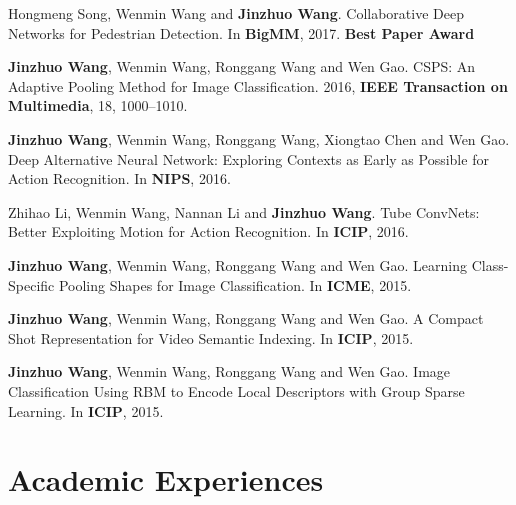 \documentclass[letterpaper]{article}
\renewenvironment{itemize}{
  \begin{list}{}{
    \setlength{\leftmargin}{1.5em}
  }
}{
  \end{list}
}
\begin{document}
\begin{itemize}
\item[9.] Hongmeng Song, Wenmin Wang and \textbf{Jinzhuo Wang}. Collaborative Deep Networks for Pedestrian Detection. In \textbf{BigMM}, 2017. \textbf{Best Paper Award}

\item[10.] \textbf{Jinzhuo Wang}, Wenmin Wang, Ronggang Wang and Wen Gao. CSPS: An Adaptive Pooling Method for Image Classification. 2016, \textbf{IEEE Transaction on Multimedia}, 18, 1000--1010.

\item[11.] \textbf{Jinzhuo Wang}, Wenmin Wang, Ronggang Wang, Xiongtao Chen and Wen Gao. Deep Alternative Neural Network: Exploring Contexts as Early as Possible for Action Recognition. In \textbf{NIPS}, 2016.

\item[12.] Zhihao Li, Wenmin Wang, Nannan Li and \textbf{Jinzhuo Wang}. Tube ConvNets: Better Exploiting Motion for Action Recognition. In \textbf{ICIP}, 2016.

\item[13.] \textbf{Jinzhuo Wang}, Wenmin Wang, Ronggang Wang and Wen Gao. Learning Class-Specific Pooling Shapes for Image Classification. In \textbf{ICME}, 2015.

\item[14.] \textbf{Jinzhuo Wang}, Wenmin Wang, Ronggang Wang and Wen Gao. A Compact Shot Representation for Video Semantic Indexing. In \textbf{ICIP}, 2015.

\item[15.] \textbf{Jinzhuo Wang}, Wenmin Wang, Ronggang Wang and Wen Gao. Image Classification Using RBM to Encode Local Descriptors with Group Sparse Learning. In \textbf{ICIP}, 2015.

\end{itemize}

\section*{Academic Experiences}
\end{document}
